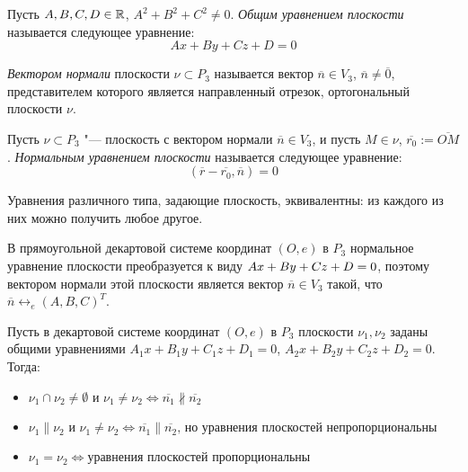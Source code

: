     \begin{definition}
    	Пусть $A, B, C, D \in \mathbb{R}$, $A^2+B^2+C^2 \ne 0$. \textit{Общим уравнением плоскости} называется следующее уравнение:
    	\[Ax + By + Cz + D = 0\]
    \end{definition}
    
    \begin{definition}
    	\textit{Вектором нормали} плоскости $\nu \subset P_3$ называется вектор $\overline{n} \in V_3$, $\overline{n} \ne \overline 0$, представителем которого является направленный отрезок, ортогональный плоскости $\nu$.
    \end{definition}
    
    \begin{definition}
    	Пусть $\nu \subset P_3$ "--- плоскость с вектором нормали $\overline{n} \in V_3$, и пусть $M \in \nu$, $\overline{r_0} := \overline{OM}$. \textit{Нормальным уравнением плоскости} называется следующее уравнение:
    	\[(\overline{r} - \overline{r_0}, \overline{n}) = 0\]
    \end{definition}
    
    \begin{note}
    	Уравнения различного типа, задающие плоскость, эквивалентны: из каждого из них можно получить любое другое.
    \end{note}
    
    \begin{note}
    	В прямоугольной декартовой системе координат $(O, e)$ в $P_3$ нормальное уравнение плоскости преобразуется к виду $Ax+By+Cz\hm{+}D=0$, поэтому вектором нормали этой плоскости является вектор $\overline{n} \in V_3$ такой, что $\overline{n} \leftrightarrow_{e} (A, B, C)^T$.
    \end{note}
    
    \begin{proposition}
    	Пусть в декартовой системе координат $(O, e)$ в $P_3$ плоскости $\nu_1, \nu_2$ заданы общими уравнениями $A_1x+B_1y+C_1z+D_1 = 0$, $A_2x+B_2y+C_2z+D_2 = 0$. Тогда:
    	\begin{itemize}
    		\item $\nu_1 \cap \nu_2 \ne \emptyset$ и $\nu_1 \ne \nu_2 \Leftrightarrow \overline{n_1} \nparallel \overline{n_2}$
    		\item $\nu_1 \parallel \nu_2 \text{ и } \nu_1 \ne \nu_2 \Leftrightarrow \overline{n_1} \parallel \overline{n_2} \text{, но уравнения плоскостей непропорциональны}$
    		\item $\nu_1 = \nu_2 \Leftrightarrow \text{уравнения плоскостей пропорциональны}$
    	\end{itemize}
    \end{proposition}
    
